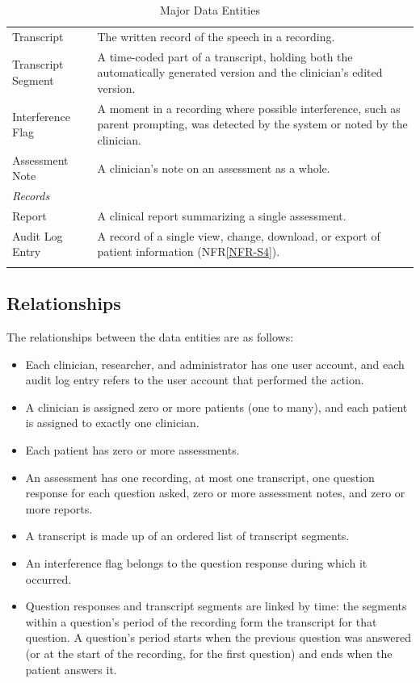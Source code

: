 \documentclass[12pt]{article}
\newcommand{\nfrref}[1]{NFR\ref{#1}}
\begin{document}
\begin{longtable}{p{} p{}}
Transcript & The written record of the speech in a recording.\\
Transcript Segment & A time-coded part of a transcript, holding both the automatically generated version and the clinician’s edited version.\\
Interference Flag & A moment in a recording where possible interference, such as parent prompting, was detected by the system or noted by the clinician.\\
Assessment Note & A clinician’s note on an assessment as a whole.\\
\midrule
\multicolumn{2}{l}{\textit{Records}}\\
\midrule
Report & A clinical report summarizing a single assessment.\\
Audit Log Entry & A record of a single view, change, download, or export of patient information (\nfrref{NFR-S4}).\\
\bottomrule
\caption{Major Data Entities} \label{tab:DataEntities}
\end{longtable}

\subsection{Relationships} \label{sec:Relationships}
The relationships between the data entities are as follows:

\begin{itemize}
\item Each clinician, researcher, and administrator has one user account, and each audit log entry refers to the user account that performed the action.
\item A clinician is assigned zero or more patients (one to many), and each patient is assigned to exactly one clinician.
\item Each patient has zero or more assessments.
\item An assessment has one recording, at most one transcript, one question response for each question asked, zero or more assessment notes, and zero or more reports.
\item A transcript is made up of an ordered list of transcript segments.
\item An interference flag belongs to the question response during which it occurred.
\item Question responses and transcript segments are linked by time: the segments within a question’s period of the recording form the transcript for that question. A question’s period starts when the previous question was answered (or at the start of the recording, for the first question) and ends when the patient answers it.
\end{itemize}
\end{document}
